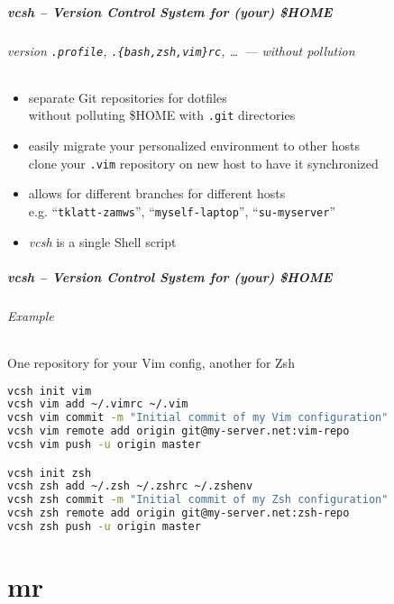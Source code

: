 \documentclass[english,hyperref={pdfpagelabels=false},aspectratio=169]{beamer}
\begin{document}
\begin{frame}[label=vcsh]
  \frametitle{vcsh -- Version Control System for (your) \$HOME}
  \framesubtitle{version \texttt{.profile}, \texttt{.\{bash,zsh,vim\}rc}, \dots~--- without pollution}
  \begin{itemize}
    \item separate Git repositories for dotfiles\\
      {\scriptsize without polluting \$HOME with \texttt{.git} directories}
    \item easily migrate your personalized environment to other hosts\\
      {\scriptsize clone your \texttt{.vim} repository on new host to have it synchronized}
    \item allows for different branches for different hosts\\
      {\scriptsize e.g. ``\texttt{tklatt-zamws}'', ``\texttt{myself-laptop}'', ``\texttt{su-myserver}''}
    \item \textit{vcsh} is a single Shell script
  \end{itemize}
\end{frame}

\begin{frame}[fragile]
  \frametitle{vcsh -- Version Control System for (your) \$HOME}
  \framesubtitle{Example}
  \begin{block}{One repository for your Vim config, another for Zsh}
    \vspace{-0.75em}
    \begin{lstlisting}[language=zsh]
vcsh init vim
vcsh vim add ~/.vimrc ~/.vim
vcsh vim commit -m "Initial commit of my Vim configuration"
vcsh vim remote add origin git@my-server.net:vim-repo
vcsh vim push -u origin master

vcsh init zsh
vcsh zsh add ~/.zsh ~/.zshrc ~/.zshenv
vcsh zsh commit -m "Initial commit of my Zsh configuration"
vcsh zsh remote add origin git@my-server.net:zsh-repo
vcsh zsh push -u origin master
    \end{lstlisting}
    \vspace{-0.75em}
  \end{block}
\end{frame}


\part{mr}
\makepart
\end{document}
